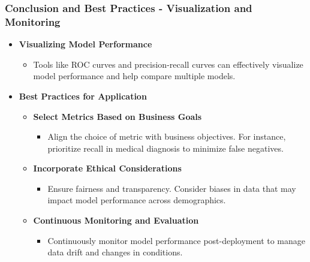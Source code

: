 \documentclass[aspectratio=169]{beamer}
\begin{document}
\begin{frame}[fragile]
  \frametitle{Conclusion and Best Practices - Visualization and Monitoring}
  \begin{itemize}
    \item \textbf{Visualizing Model Performance}
    \begin{itemize}
      \item Tools like ROC curves and precision-recall curves can effectively visualize model performance and help compare multiple models.
    \end{itemize}
    
    \item \textbf{Best Practices for Application}
    \begin{itemize}
      \item \textbf{Select Metrics Based on Business Goals}
      \begin{itemize}
        \item Align the choice of metric with business objectives. For instance, prioritize recall in medical diagnosis to minimize false negatives.
      \end{itemize}
      
      \item \textbf{Incorporate Ethical Considerations}
      \begin{itemize}
        \item Ensure fairness and transparency. Consider biases in data that may impact model performance across demographics.
      \end{itemize}
      
      \item \textbf{Continuous Monitoring and Evaluation}
      \begin{itemize}
        \item Continuously monitor model performance post-deployment to manage data drift and changes in conditions.
      \end{itemize}
    \end{itemize}
  \end{itemize}
\end{frame}
\end{document}
